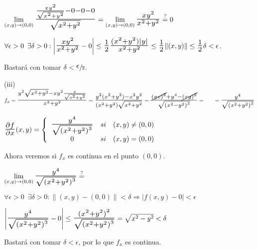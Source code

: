 \documentclass[12pt, titlepage]{article}
\newcommand{\eqc}[1]{\stackrel{\mathclap{\normalfont\mbox{\scriptsize{#1}}}}{=}}
\newcommand{\bfrac}[2]{\scalebox{1.4}{$\frac{#1}{#2}$}}
\newcommand{\spac}{\, \, \,}
\begin{document}
$\displaystyle \lim_{(x, y) \to (0, 0)} \bfrac{\frac{xy^2}{\sqrt{x^2 + y^2}} - 0 - 0 - 0}{\sqrt{x^2 + y^2}} = 
\lim_{(x, y) \to (0, 0)} \bfrac{xy^2}{x^2 + y^2} \eqc{?} 0$
\vspace{3mm}

$\forall \epsilon >0 \spac \exists \delta > 0 : \left | \bfrac{xy^2}{x^2 + y^2} - 0 \right | \leq \bfrac{1}{2} 
\bfrac{(x^2 + y^2) |y|}{x^2 + y^2} \leq \bfrac{1}{2} \|(x, y)\| \leq \bfrac{1}{2} \delta < \epsilon$. \\
\vspace{3mm}

Bastará con tomar $\delta < \sfrac{\scalebox{1.5}{$\epsilon$}}{2}$.
\vspace{5mm}

(iii) $f_x = \bfrac{y^2 \sqrt{x^2 + y^2} - xy^2 \frac{x}{\sqrt{x^2 + y^2}}}{x^2 + y^2} = 
\bfrac{y^2 (x^2 + y^2) - x^2y^2}{(x^2 + y^2) \sqrt{x^2 + y^2}} = \bfrac{\cancel{{(yx)}^2} + y^4 - \cancel{{(xy)^2}}}{\sqrt{{(x^2 - y^2)}^3}} = \\ \indent = \bfrac{y^4}{\sqrt{{(x^2 + y^2)}^3}}$
\vspace{3mm}

$\bfrac{\partial f}{\partial x} (x, y) = \left \{
\begin{array}{ccc}

\bfrac{y^4}{\sqrt{{(x^2 + y^2)}^3}} & si & (x, y) \neq (0, 0)\\
0 & si & (x, y) = (0, 0)\\

\end{array}\right .
$
\vspace{3mm}

Ahora veremos si $f_x$ es continua en el punto $(0, 0)$.
\vspace{3mm}

$\displaystyle \lim_{(x, y) \to (0, 0)} \bfrac{y^4}{\sqrt{{(x^2 + y^2)}^3}} \eqc{?}$
\vspace{3mm}

$\forall \epsilon > 0 \spac \exists \delta > 0 : \|(x ,y) - (0, 0)\| < \delta \Rightarrow |f (x, y) - 0| < \epsilon$
\vspace{3mm}

$\left | \bfrac{y^4}{\sqrt{{(x^2 + y^2)}^3}} - 0 \right | \leq \bfrac{{(x^2 + y^2)}^2}{\sqrt{{(x^2 + y^2)}
^3}} = \sqrt{x^2 - y^2} < \delta$
\vspace{3mm}

Bastará con tomar $\delta < \epsilon$, por lo que $f_x$ es continua.
\vspace{5mm}
\end{document}
